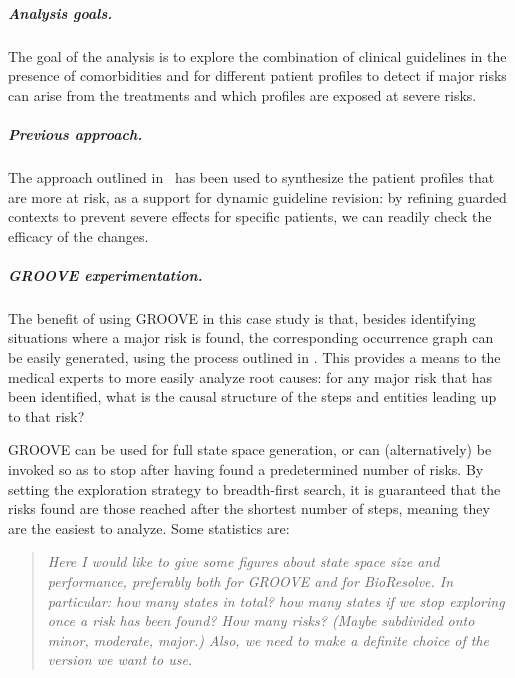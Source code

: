 \subparagraph*{Analysis goals.}
The goal of the analysis is to explore the combination of clinical guidelines in the presence of comorbidities and for different patient profiles to detect if major risks can arise from the treatments and which profiles are exposed at severe risks.

\subparagraph*{Previous approach.}
The approach outlined in~\cite{DBLP:conf/cmsb/BowlesBBFGM24} has been used to synthesize the patient profiles that are more at risk, as a support for dynamic guideline revision: by refining guarded contexts to prevent severe effects for specific patients, we can readily check the efficacy of the changes.

\subparagraph*{GROOVE experimentation.}

The benefit of using GROOVE in this case study is that, besides identifying situations where a major risk is found, the corresponding occurrence graph can be easily generated, using the process outlined in . This provides a means to the medical experts to more easily analyze root causes: for any major risk that has been identified, what is the causal structure of the steps and entities leading up to that risk?

GROOVE can be used for full state space generation, or can (alternatively) be invoked so as to stop after having found a predetermined number of risks. By setting the exploration strategy to breadth-first search, it is guaranteed that the risks found are those reached after the shortest number of steps, meaning they are the easiest to analyze. Some statistics are:

\begin{quote}\it
Here I would like to give some figures about state space size and performance, preferably both for GROOVE and for BioResolve. In particular: how many states in total? how many states if we stop exploring once a risk has been found? How many risks? (Maybe subdivided onto minor, moderate, major.) Also, we need to make a definite choice of the version we want to use.
\end{quote}



